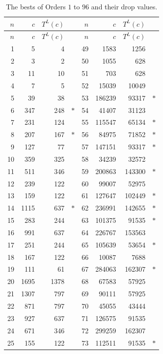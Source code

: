\documentclass[10pt,a4paper,titlepage]{article}
\theoremstyle{plain}
\theoremstyle{definition}
\theoremstyle{remark}
\begin{document}
{\footnotesize\setlength{\extrarowheight}{1pt}
\begin{longtable}{|r|r|rc||r|r|rc|}
\caption{The bests of Orders $1$ to $96$ and their drop values.}\label{tab:bests}\\
\hline
$n$ & $c$ & $T^L(c)$ & & $n$ & $c$ & $T^L(c)$ & \\
\hline
\endfirsthead
\hline
$n$ & $c$ & $T^L(c)$ & & $n$ & $c$ & $T^L(c)$ & \\
\hline
\endhead
1 & 5 & 4 &  & 49 & 1583 & 1256 &  \\
2 & 3 & 2 &  & 50 & 1055 & 628 &  \\
3 & 11 & 10 &  & 51 & 703 & 628 &  \\
4 & 7 & 5 &  & 52 & 15039 & 10049 &  \\
5 & 39 & 38 &  & 53 & 186239 & 93317 & $\ast$ \\
6 & 347 & 248 & $\ast$ & 54 & 41407 & 31123 &  \\
7 & 231 & 124 &  & 55 & 115547 & 65134 & $\ast$ \\
8 & 207 & 167 & $\ast$ & 56 & 84975 & 71852 & $\ast$ \\
9 & 127 & 77 &  & 57 & 147151 & 93317 & $\ast$ \\
10 & 359 & 325 &  & 58 & 34239 & 32572 &  \\
11 & 511 & 346 &  & 59 & 200863 & 143300 & $\ast$ \\
12 & 239 & 122 &  & 60 & 99007 & 52975 &  \\
13 & 159 & 122 &  & 61 & 127647 & 102449 & $\ast$ \\
14 & 1115 & 637 & $\ast$ & 62 & 236991 & 142655 & $\ast$ \\
15 & 283 & 244 &  & 63 & 101375 & 91535 & $\ast$ \\
16 & 991 & 637 &  & 64 & 226767 & 153563 &  \\
17 & 251 & 244 &  & 65 & 105639 & 53654 & $\ast$ \\
18 & 167 & 122 &  & 66 & 10087 & 7688 &  \\
19 & 111 & 61 &  & 67 & 284063 & 162307 & $\ast$ \\
20 & 1695 & 1378 &  & 68 & 67583 & 57925 &  \\
21 & 1307 & 797 &  & 69 & 90111 & 57925 &  \\
22 & 871 & 797 &  & 70 & 45055 & 43444 &  \\
23 & 927 & 637 &  & 71 & 126575 & 91535 &  \\
24 & 671 & 346 &  & 72 & 299259 & 162307 &  \\
25 & 155 & 122 &  & 73 & 112511 & 91535 & $\ast$ \\

\end{longtable}}
\end{document}
